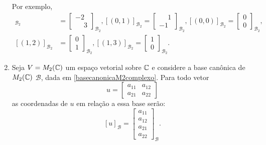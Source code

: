 \begin{exemplos}
\begin{enumerate}
      Por exemplo,
      \begin{align*}
        [(1, 0)]_{\mathcal{B}_2} &= \begin{bmatrix}-2\\\phantom{-}3\end{bmatrix}_{\mathcal{B}_2},
        [(0, 1)]_{\mathcal{B}_2} = \begin{bmatrix}\phantom{-}1\\-1\end{bmatrix}_{\mathcal{B}_2},
        [(0, 0)]_{\mathcal{B}_2} = \begin{bmatrix}0\\0\end{bmatrix}_{\mathcal{B}_2},\\
        [(1, 2)]_{\mathcal{B}_2} &= \begin{bmatrix}0\\1\end{bmatrix}_{\mathcal{B}_2},
        [(1, 3)]_{\mathcal{B}_2} = \begin{bmatrix}1\\0\end{bmatrix}_{\mathcal{B}_2}.
      \end{align*}

    \item Seja $V = M_2(\mathbb{C})$ um espaço vetorial sobre $\mathbb{C}$ e considere a base canônica de $M_2(\mathbb{C})$ $\mathcal{B}$, dada em \ref{basecanonicaM2complexo}. Para todo vetor
      \[
        u = \begin{bmatrix}
          a_{11} & a_{12}\\
          a_{21} & a_{22}
        \end{bmatrix}
      \]
      as coordenadas de $u$ em relação a essa base serão:
      \[
        [u]_\mathcal{B} = \begin{bmatrix}a_{11}\\a_{12}\\a_{21}\\a_{22}\end{bmatrix}_\mathcal{B}.
      \]


\end{enumerate}
\end{exemplos}

